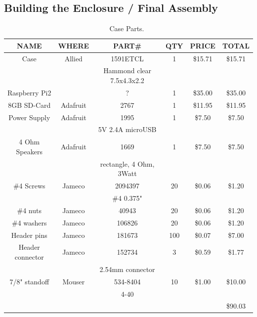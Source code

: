 \documentclass[11pt]{article}
\begin{document}
\subsection{Building the Enclosure / Final Assembly}


\begin{table}[thp]

\caption{Case Parts.~\label{table:case_parts}}
\centering
\sf
\begin{tabular}{|c|c|c|c|c|c|}
\hline
NAME		& WHERE		& PART\#	           & QTY & PRICE    & TOTAL \\
\hline
\hline
Case		& Allied	& 1591ETCL		   & 1   & \$15.71   & \$15.71 \\
		&		& Hammond clear 7.5x4.3x2.2&     &           &         \\
\hline
Raspberry Pi2	&		&		?	   & 1   & \$35.00   & \$35.00 \\
\hline
8GB SD-Card	& Adafruit	& 2767			   & 1   & \$11.95   & \$11.95 \\
\hline
Power Supply	& Adafruit	& 1995			   & 1   & \$7.50    & \$7.50  \\
		&		& 5V 2.4A microUSB	   &     &           &         \\
\hline
4 Ohm Speakers	& Adafruit	& 1669			   & 1	 & \$7.50    & \$7.50  \\ 
		&		& rectangle, 4 Ohm, 3Watt  &     &           &         \\
\hline
\#4 Screws	& Jameco	& 2094397	  	   & 20  & \$0.06   & \$1.20  \\
		&		& \#4 0.375"		   &     &          &         \\
\hline
\#4 nuts	& Jameco	& 40943	   	           & 20  & \$0.06   & \$1.20  \\
\hline
\#4 washers	& Jameco	& 106826	   	   & 20  & \$0.06   & \$1.20  \\
\hline
Header pins	& Jameco	& 181673	           & 100 & \$0.07   & \$7.00  \\
\hline
Header connector& Jameco	& 152734	           & 3   & \$0.59   & \$1.77  \\
		&		& 2.54mm connector	   &     &          &         \\
\hline
7/8" standoff	& Mouser	& 534-8404		   & 10  & \$1.00   & \$10.00   \\
		&		& 4-40			   &     &          &          \\
\hline
\hline
		&		&		&	&		& \$90.03 \\
\hline
\end{tabular}
\end{table}
\end{document}

